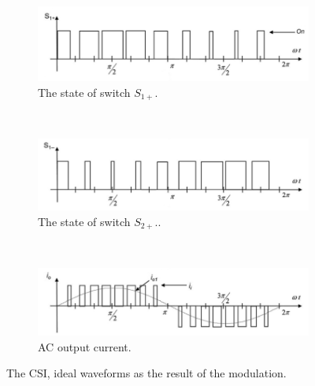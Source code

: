 \begin{figure}[h!]
                \centering
                \begin{subfigure}[b]{0.9\textwidth}
                    \includegraphics[width=\textwidth]{EMPC_PNG_Pics/CSIwaves_A.png}
                    \caption{\centering The state of switch $S_{1+}$.}
                    \label{BASICCSR:fig:CSIwave_A}
                \end{subfigure}
                ~ %
                \begin{subfigure}[b]{0.9\textwidth}
                    \includegraphics[width=\textwidth]{EMPC_PNG_Pics/CSIwaves_B.png}
                    \caption{\centering The state of switch $S_{2+}$..}
                    \label{BASICCSR:fig:CSIwave_B}
                \end{subfigure}
								 ~ %
                \begin{subfigure}[b]{0.9\textwidth}
                    \includegraphics[width=\textwidth]{EMPC_PNG_Pics/CSIwaves_C.png}
                    \caption{\centering AC output current.}
                    \label{BASICCSR:fig:CSIwave_C}
                \end{subfigure}

                \caption{The CSI, ideal waveforms as the result of the modulation.}
                \label{BASICCSR:fig:CSIwave_All}
            \end{figure}

